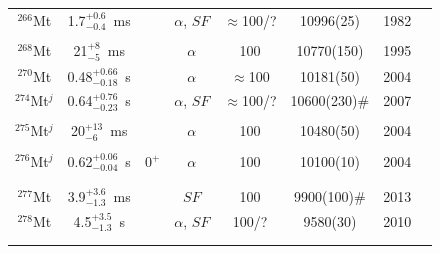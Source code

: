 \begin{center}
\begin{longtable}{c|ccccccl}
$^{266}$Mt	& 1.7$^{+0.6}_{-0.4}$~ms&	&$\alpha$, $SF$		&$\approx$100/?&10996(25)	    &1982	&{\tiny\cite{Muenzenberg1982,Muenzenberg1984a,Muenzenberg1988a,Muenzenberg1989b,Hofmann1997b,Hessberger1999}}\\
			&				&			&					&			& 				    &		&{\tiny\cite{Nelson2009,Ito2018}}\\
$^{268}$Mt	& 21$^{+8}_{-5}$~ms& 		&$\alpha$			&100	    &10770(150)	        &1995	&{\tiny\cite{Hofmann1995a,Hofmann2002,Folden2004,Morita2004c,Morimoto2004}}\\
$^{270}$Mt	&0.48$^{+0.66}_{-0.18}$~s& 	&$\alpha$			&$\approx$100&10181(50)		    &2004	&{\tiny\cite{Morita2004b,Morita2007a,Morita2008,Morita2009,Morita2012,Morita2015}}\\
$^{274}$Mt$^j$& 0.64$^{+0.76}_{-0.23}$~s& &$\alpha$, $SF$	&$\approx$100/?&10600(230)$\#$  &2007	&{\tiny\cite{Oganessian2007b,Oganessian2007,Oganessian2007a,Oganessian2011,Oganessian2013,Oganessian2015}}\\
			&				&			&					&			& 				    &		&{\tiny\cite{Oganessian2017,Oganessian2022d}}\\
$^{275}$Mt$^j$& 20$^{+13}_{-6}$~ms&	    &$\alpha$			&100		&10480(50)		    &2004	&{\tiny\cite{Oganessian2004b,Oganessian2005,Oganessian2007,Oganessian2007a,Oganessian2011,Oganessian2013}}\\
			&				&			&					&			& 				    &		&{\tiny\cite{Oganessian2015,Oganessian2017,Oganessian2022d}}\\
$^{276}$Mt$^j$& 0.62$^{+0.06}_{-0.04}$~s& 0$^+$&$\alpha$	&100		&10100(10)		    &2004	&{\tiny\cite{Oganessian2004,Dmitriev2005,Oganessian2005,Oganessian2011,Oganessian2012,Oganessian2013}}\\
			&				&			&					&			& 				    &		&{\tiny\cite{Rudolph2013,Dmitriev2014,Gates2015,Oganessian2015,Rudolph2015,Forsberg2016}}\\
			&				&			&					&			& 				    &		&{\tiny\cite{Aksenov2017,Oganessian2017,Gates2018,Oganessian2022d}}\\
$^{277}$Mt	& 3.9$^{+3.6}_{-1.3}$~ms& 	&$SF$				&100		&9900(100)$\#$	    &2013	&{\tiny\cite{Oganessian2013b,Oganessian2015,Oganessian2017,Khuyagbaatar2019}}\\
$^{278}$Mt	& 4.5$^{+3.5}_{-1.3}$~s& 	&$\alpha$, $SF$	    &100/?		&9580(30)		    &2010	&{\tiny\cite{Oganessian2010,Oganessian2011,Oganessian2011a,Oganessian2012a,Khuyagbaatar2014,Oganessian2015}}\\
			&				&			&					&			& 				    &		&{\tiny\cite{Oganessian2017,Khuyagbaatar2019}}\\
\hline\\

\end{longtable}
\end{center}
